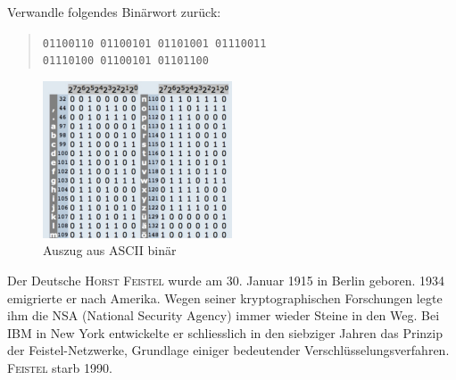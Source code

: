 \documentclass[%
11pt,%
twoside,%
titlepage,%
german,%
headsepline%
]{scrartcl}
\begin{document}
\begin{ueb}
Verwandle folgendes Binärwort zurück:
\begin{quote}
\texttt{01100110 01100101 01101001 01110011}\\
\texttt{01110100 01100101 01101100}
\end{quote}
\end{ueb}

\begin{figure}
\begin{center}
\includegraphics[width=0.5\textwidth]{pictures/ascii}
\end{center}
\caption{Auszug aus ASCII binär}\label{abb:asciibin}
\end{figure}

Der Deutsche \textsc{Horst Feistel} wurde am 30. Januar 1915 in Berlin geboren. 1934 emigrierte er nach Amerika. Wegen seiner kryptographischen Forschungen legte ihm die NSA (National Security Agency) immer wieder Steine in den Weg. Bei IBM in New York entwickelte er schliesslich in den siebziger Jahren das Prinzip der Feistel-Netzwerke, Grundlage einiger bedeutender Verschlüsselungsverfahren. 
\textsc{Feistel} starb 1990.
\end{document}
